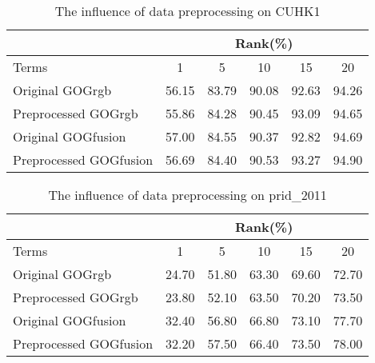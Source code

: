 \begin{table}[H]
\centering
\caption{The influence of data preprocessing on CUHK1}
\begin{tabular}{|l|c|c|c|c|c|}
\hline
 & \multicolumn{5}{|c|}{Rank(\%)} \\
 \hline
Terms  &1 &5 & 10 &15& 20\\
\hline
Original GOGrgb&56.15&83.79&90.08& 92.63&94.26 \\
\hline
Preprocessed GOGrgb &55.86&84.28&90.45& 93.09&94.65\\
 \hline
Original GOGfusion &57.00&84.55& 90.37& 92.82&94.69\\
\hline
Preprocessed GOGfusion &56.69&84.40& 90.53& 93.27&94.90\\
 \hline
 
\end{tabular}
\end{table}
\begin{table}[H]
\centering
\caption{The influence of data preprocessing on prid\_2011}
\begin{tabular}{|l|c|c|c|c|c|}
\hline
 & \multicolumn{5}{|c|}{Rank(\%)} \\
 \hline
Terms  &1 &5 & 10 &15& 20\\
\hline
Original GOGrgb&24.70& 51.80& 63.30& 69.60& 72.70\\
\hline
Preprocessed GOGrgb &23.80& 52.10& 63.50& 70.20& 73.50\\
\hline
Original GOGfusion &32.40& 56.80& 66.80& 73.10& 77.70\\
\hline
Preprocessed GOGfusion &32.20& 57.50& 66.40& 73.50& 78.00\\
 \hline
 
\end{tabular}
\end{table}

